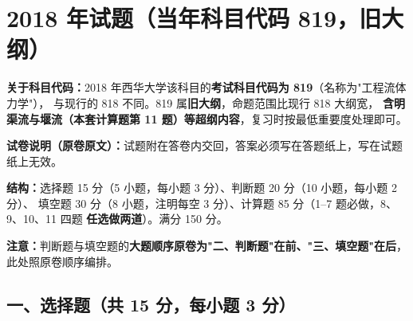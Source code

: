 \chapter{2018 年试题（当年科目代码 819，旧大纲）}

\begin{tishi}
\textbf{关于科目代码：}2018 年西华大学该科目的\textbf{考试科目代码为 819}（名称为"工程流体力学"），
与现行的 818 不同。819 属\textbf{旧大纲}，命题范围比现行 818 大纲宽，
\textbf{含明渠流与堰流（本套计算题第 11 题）等超纲内容}，复习时按最低重要度处理即可。

\textbf{试卷说明（原卷原文）：}试题附在答卷内交回，答案必须写在答题纸上，写在试题纸上无效。

\textbf{结构：}选择题 15 分（5 小题，每小题 3 分）、判断题 20 分（10 小题，每小题 2 分）、
填空题 30 分（8 小题，注明每空 3 分）、计算题 85 分（1--7 题必做，8、9、10、11 四题
\textbf{任选做两道}）。满分 150 分。

\textbf{注意：}判断题与填空题的\textbf{大题顺序原卷为"二、判断题"在前、"三、填空题"在后}，
此处照原卷顺序编排。
\end{tishi}

\section{一、选择题（共 15 分，每小题 3 分）}

